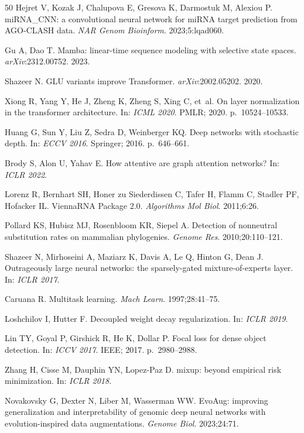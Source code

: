 \documentclass[sn-mathphys-num]{sn-jnl}
\begin{document}
\begin{thebibliography}{50}
Hejret V, Kozak J, Chalupova E, Gresova K, Darmostuk M, Alexiou P. miRNA\_CNN: a convolutional neural network for miRNA target prediction from AGO-CLASH data. \textit{NAR Genom Bioinform}. 2023;5:lqad060.

Gu A, Dao T. Mamba: linear-time sequence modeling with selective state spaces. \textit{arXiv}:2312.00752. 2023.

Shazeer N. GLU variants improve Transformer. \textit{arXiv}:2002.05202. 2020.

Xiong R, Yang Y, He J, Zheng K, Zheng S, Xing C, et~al. On layer normalization in the transformer architecture. In: \textit{ICML 2020}. PMLR; 2020. p.~10524--10533.

Huang G, Sun Y, Liu Z, Sedra D, Weinberger KQ. Deep networks with stochastic depth. In: \textit{ECCV 2016}. Springer; 2016. p.~646--661.

Brody S, Alon U, Yahav E. How attentive are graph attention networks? In: \textit{ICLR 2022}.

Lorenz R, Bernhart SH, Honer zu Siederdissen C, Tafer H, Flamm C, Stadler PF, Hofacker IL. ViennaRNA Package 2.0. \textit{Algorithms Mol Biol}. 2011;6:26.

Pollard KS, Hubisz MJ, Rosenbloom KR, Siepel A. Detection of nonneutral substitution rates on mammalian phylogenies. \textit{Genome Res}. 2010;20:110--121.

Shazeer N, Mirhoseini A, Maziarz K, Davis A, Le Q, Hinton G, Dean J. Outrageously large neural networks: the sparsely-gated mixture-of-experts layer. In: \textit{ICLR 2017}.

Caruana R. Multitask learning. \textit{Mach Learn}. 1997;28:41--75.

Loshchilov I, Hutter F. Decoupled weight decay regularization. In: \textit{ICLR 2019}.

Lin TY, Goyal P, Girshick R, He K, Dollar P. Focal loss for dense object detection. In: \textit{ICCV 2017}. IEEE; 2017. p.~2980--2988.

Zhang H, Cisse M, Dauphin YN, Lopez-Paz D. mixup: beyond empirical risk minimization. In: \textit{ICLR 2018}.

Novakovsky G, Dexter N, Liber M, Wasserman WW. EvoAug: improving generalization and interpretability of genomic deep neural networks with evolution-inspired data augmentations. \textit{Genome Biol}. 2023;24:71.


\end{thebibliography}
\end{document}
